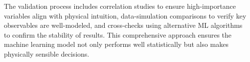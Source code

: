 The validation process includes correlation studies to ensure high-importance variables align with physical intuition, data-simulation comparisons to verify key observables are well-modeled, and cross-checks using alternative ML algorithms to confirm the stability of results. This comprehensive approach ensures the machine learning model not only performs well statistically but also makes physically sensible decisions.